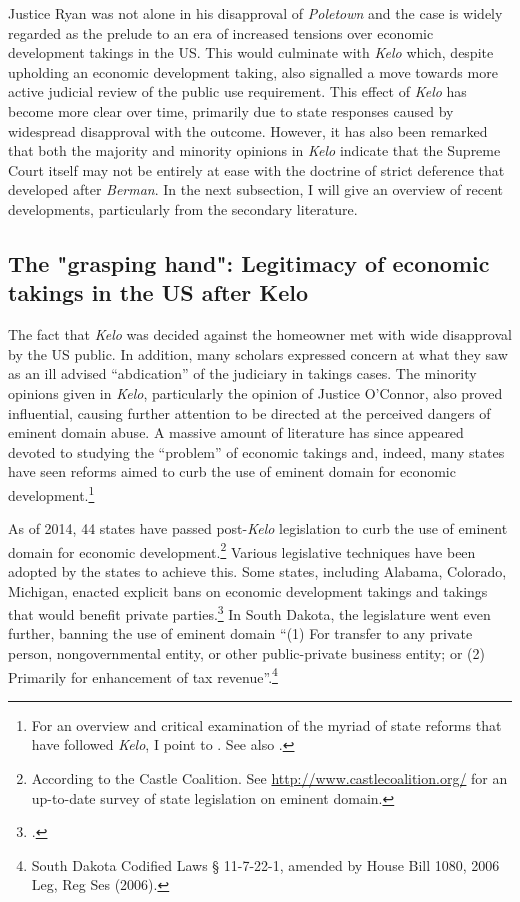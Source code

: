 Justice Ryan was not alone in his disapproval of {\it Poletown} and the case is widely regarded as the prelude to an era of increased tensions over economic development takings in the US. This would culminate with {\it Kelo} which, despite upholding an economic development taking, also signalled a move towards more active judicial review of the public use requirement. This effect of {\it Kelo} has become more clear over time, primarily due to state responses caused by widespread disapproval with the outcome. However, it has also been remarked that both the majority and minority opinions in {\it Kelo} indicate that the Supreme Court itself may not be entirely at ease with the doctrine of strict deference that developed after {\it Berman}. In the next subsection, I will give an overview of recent developments, particularly from the secondary literature.

\subsection{The "grasping hand": Legitimacy of economic takings in the US after Kelo}

The fact that {\it Kelo} was decided against the homeowner met with wide disapproval by the US public. In addition, many scholars expressed concern at what they saw as an ill advised ``abdication'' of the judiciary in takings cases. The minority opinions given in {\it Kelo}, particularly the opinion of Justice O'Connor, also proved influential, causing further attention to be directed at the perceived dangers of eminent domain abuse. A massive amount of literature has since appeared devoted to studying the ``problem'' of economic takings and, indeed, many states have seen reforms aimed to curb the use of eminent domain for economic development.\footnote{For an overview and critical examination of the myriad of state reforms that have followed {\it Kelo}, I point to \cite{eagle08}. See also \cite{somin09}.} 

As of 2014, 44 states have passed post-{\it Kelo} legislation to curb the use of eminent domain for economic development.\footnote{According to the Castle Coalition. See \url{http://www.castlecoalition.org/} for an up-to-date survey of state legislation on eminent domain.} 
Various legislative techniques have been adopted by the states to achieve this. Some states, including Alabama, Colorado, Michigan, enacted explicit bans on economic development takings and takings that would benefit private parties.\footcite[See][107-108]{eagle08} In South Dakota, the legislature went even further, banning the use of eminent domain  ``(1) For transfer to any private person, nongovernmental entity, or other public-private business entity; or (2) Primarily for enhancement of tax revenue''.\footnote{South Dakota Codified Laws § 11-7-22-1, amended by House Bill 1080, 2006 Leg, Reg Ses (2006).}

